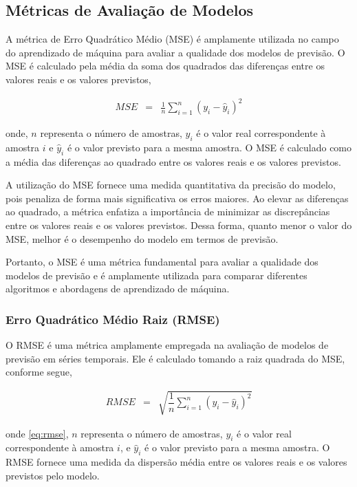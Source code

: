 \subsection{M\'etricas de Avalia\c c\~ao de Modelos}\label{subsec:metrica}

A métrica de Erro Quadrático Médio (MSE) é amplamente utilizada no campo do aprendizado de máquina para avaliar a qualidade dos modelos de previsão. O MSE é calculado pela média da soma dos quadrados das diferenças entre os valores reais e os valores previstos,

\begin{eqnarray}
	MSE &=& \frac{1}{n} \sum_{i=1}^{n} (y_i - \hat{y}_i)^2 \label{eq:mse}
\end{eqnarray}

\noindent onde, $n$ representa o número de amostras, $y_i$ é o valor real correspondente à amostra $i$ e $\hat{y}_i$ é o valor previsto para a mesma amostra. O MSE é calculado como a média das diferenças ao quadrado entre os valores reais e os valores previstos.

A utilização do MSE fornece uma medida quantitativa da precisão do modelo, pois penaliza de forma mais significativa os erros maiores. Ao elevar as diferenças ao quadrado, a métrica enfatiza a importância de minimizar as discrepâncias entre os valores reais e os valores previstos. Dessa forma, quanto menor o valor do MSE, melhor é o desempenho do modelo em termos de previsão.

Portanto, o MSE é uma métrica fundamental para avaliar a qualidade dos modelos de previsão e é amplamente utilizada para comparar diferentes algoritmos e abordagens de aprendizado de máquina.

\subsubsection{Erro Quadr\'atico M\'edio Raiz (RMSE)}

O RMSE é uma métrica amplamente empregada na avaliação de modelos de previsão em séries temporais. Ele é calculado tomando a raiz quadrada do MSE, conforme segue,

\begin{eqnarray}
	RMSE &=& \sqrt{\dfrac{1}{n} \sum_{i=1}^{n} (y_i - \hat{y}_i)^2} \label{eq:rmse}
\end{eqnarray}

\noindent onde \eqref{eq:rmse}, $n$ representa o número de amostras, $y_i$ é o valor real correspondente à amostra $i$, e $\hat{y}_i$ é o valor previsto para a mesma amostra. O RMSE fornece uma medida da dispersão média entre os valores reais e os valores previstos pelo modelo.


